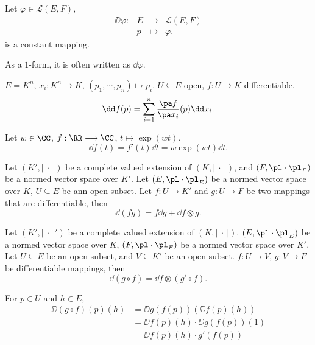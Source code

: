 \begin{exampleenv}
    Let $\varphi\in \mathscr{L}(E,F)$, 
    $$\begin{array}{rrcl}
        \DD \varphi:& E&\longrightarrow &\mathscr{L}(E,F)\\
        & p&\longmapsto& \varphi.
    \end{array}$$
    is a constant mapping.

    As a $1$-form, it is often written as $\dd \varphi$.
    \begin{exampleenv}
        $E=K^n$, $x_i: K^n\longrightarrow K$, $(p_1,\cdots,p_n)\longmapsto p_i$. $U\subseteq E$ open, $f: U\longrightarrow K$ differentiable.
        $$ \dd f(p)=\sum_{i=1}^{n}\frac{\pa f}{\pa x_i}(p)\dd x_i.$$
    \end{exampleenv}
    \begin{exampleenv}
        Let $w\in \CC$, $f: \RR\longrightarrow \CC$, $t\longmapsto \exp(wt)$.
        $$ \dd f(t)=f'(t)\dd t=w\exp(wt) \dd t.$$
    \end{exampleenv}
\end{exampleenv}
\begin{propositionenv}
    Let $(K',\left|\ \cdot\ \right|)$ be a complete valued extension of $(K,\left|\ \cdot\ \right|)$, and $(F,\pl\cdot\pl_F)$ be a normed vector space over $K'$. Let $(E,\pl\cdot\pl_E)$ be a normed vector space over $K$, $U\subseteq E$ be ann open subset.
    Let $f: U\longrightarrow K'$ and $g: U\longrightarrow F$ be two mappings that are differentiable, then 
    $$ \dd(f g)=f \dd g+\dd f \otimes g.$$
\end{propositionenv}
\begin{propositionenv}
    Let $(K',\left| \ \cdot\ \right|')$ be a complete valued extension of $(K,\left|\ \cdot\ \right|)$. $(E,\pl\cdot\pl_E)$ be a normed vector space over $K$, $(F,\pl\cdot\pl_F)$ be a normed vector space over $K'$. Let $U\subseteq E$ be an open subset, and $V\subseteq K'$ be an open subset. $f:U\longrightarrow V$, $g:V\longrightarrow F$ be differentiable mappings, then 
    $$ \dd(g\circ f)= \dd f \otimes (g'\circ f).$$
\end{propositionenv}
\begin{proofenv}
    For $p\in U$ and $h\in E$,
    \begin{align*}
        \DD(g\circ f)(p)(h)&=\DD g(f(p))(\DD f(p)(h))\\
        &=\DD f(p)(h)\cdot \DD g(f(p))(1)\\
        &=\DD f(p)(h)\cdot g'(f(p))\\
    \end{align*}
\end{proofenv}
